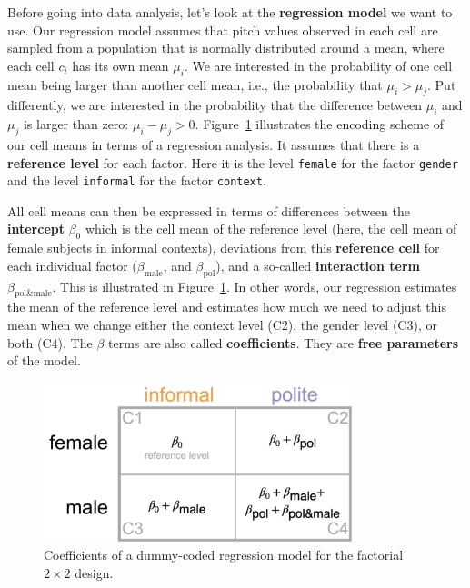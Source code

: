 \documentclass[nobib]{tufte-handout}
\newcommand{\tr}[1]{\textcolor{DarkOrange}{[tr: #1]}}
\begin{document}
Before going into data analysis, let's look at the \textbf{regression model} we want to use.
%
%
Our regression model assumes that pitch values observed in each cell are
sampled from a population that is normally distributed around a mean, where each cell $c_i$ has its own mean $\mu_i$. We are interested in the probability of one cell mean being larger than another cell mean, i.e., the probability that $\mu_i > \mu_j$. Put differently, we are interested in the probability that the difference between $\mu_i$ and $\mu_j$ is larger than zero: $\mu_i - \mu_j > 0$.
Figure~\ref{fig:coefficients_table} illustrates the encoding scheme of our cell means in terms of a regression analysis. It assumes that
there is a \textbf{reference level} for each factor. Here it is the level \texttt{female} for
the factor \texttt{gender} and the level \texttt{informal} for the factor
\texttt{context}. 
  
All cell means can then be expressed in terms of differences between the \textbf{intercept}
$\beta_0$ which is the cell mean of the reference level (here, the cell mean of female subjects
in informal contexts), deviations from this \textbf{reference cell} for each individual factor
($\beta_{\text{male}}$, and $\beta_{\text{pol}}$), and a so-called \textbf{interaction term}
$\beta_{\text{pol\&male}}$. This is illustrated in Figure~\ref{fig:coefficients_table}. In
other words, our regression estimates the mean of the reference level and estimates how much we
need to adjust this mean when we change either the context level (C2), the gender level (C3),
or both (C4). The $\beta$ terms are also called \textbf{coefficients}. They are \textbf{free
  parameters} of the model.

\begin{figure}[]
  \centering
    \includegraphics[width = 0.8\textwidth]{pics/table_coefficients.pdf}
    \caption{Coefficients of a dummy-coded regression model for the factorial $2 \times 2$ design.}
    \label{fig:coefficients_table}
\end{figure}
\end{document}
